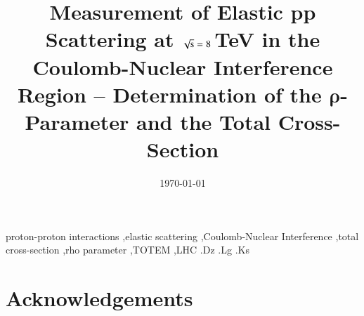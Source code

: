 \documentclass[3p,onecolumn,12pt,times,longtitle]{elsarticle}
\begin{document}
\begin{frontmatter}

\title{Measurement of Elastic pp Scattering at $\sqrt{\hbox{s}} = \hbox{8}$\,TeV in the Coulomb-Nuclear Interference Region -- Determination of the $\mathbf{\rho}$-Parameter and the Total Cross-Section}



\date{\today}

\begin{abstract}

\end{abstract}

\begin{keyword}
proton-proton interactions \sep elastic scattering \sep Coulomb-Nuclear Interference \sep total cross-section \sep rho parameter \sep TOTEM \sep LHC
.Dz %
.Lg %
.Ks %
\end{keyword}
\end{frontmatter}

















\section*{Acknowledgements}



\begin{thebibliography}{99}

\end{thebibliography}
\end{document}
